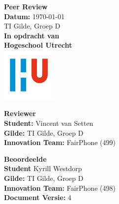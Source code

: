 \documentclass[a4paper]{article}
\begin{document}
\begin{titlepage}
  \begin{center}
      \vspace*{.9cm}
      \Huge
      \textbf{ Peer Review }\\
      \vspace{0.2cm}
      \small \textbf{Datum:} \today \\
      \small TI Gilde, Groep D \\

      \vspace{2cm}
      \normalsize
      \vspace{1cm}
      \Large
      \textbf{In opdracht van}\\
      \large
      \textbf{Hogeschool Utrecht} \\
      \includegraphics[width=0.2\textwidth]{Images/logouni.png}
      \vfill

      \begin{minipage}{0.45\textwidth}
        \large
        \textbf{Reviewer}\\
        \normalsize
        \textbf{Student:} Vincent van Setten \\
        \textbf{Gilde:} TI Gilde, Groep D\\
        \textbf{Innovation Team:} FairPhone (499) \\
        \vspace{2cm}
      \end{minipage}
      \hfill
      \begin{minipage}{0.45\textwidth}
        \large
        \textbf{Beoordeelde}\\
        \normalsize
        \textbf{Student} Kyrill Westdorp  \\
        \textbf{Gilde:} TI Gilde, Groep D\\
        \textbf{Innovation Team:} FairPhone (498) \\
        \textbf{Document Versie:} 4 \\
        \vspace{2cm}
      \end{minipage}
    \end{center}
\end{titlepage}
\end{document}
